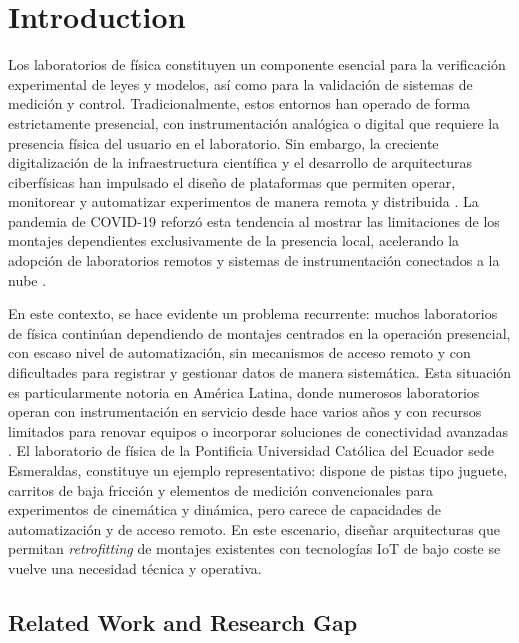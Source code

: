 \documentclass[journal,article,submit,pdftex]{Definitions/mdpi}
\begin{document}

\section{Introduction}

Los laboratorios de f\'isica constituyen un componente esencial para la verificaci\'on experimental de leyes y modelos, as\'i como para la validaci\'on de sistemas de medici\'on y control. Tradicionalmente, estos entornos han operado de forma estrictamente presencial, con instrumentaci\'on anal\'ogica o digital que requiere la presencia f\'isica del usuario en el laboratorio. Sin embargo, la creciente digitalizaci\'on de la infraestructura cient\'ifica y el desarrollo de arquitecturas ciberf\'isicas han impulsado el dise\~no de plataformas que permiten operar, monitorear y automatizar experimentos de manera remota y distribuida \cite{r1}. La pandemia de COVID-19 reforz\'o esta tendencia al mostrar las limitaciones de los montajes dependientes exclusivamente de la presencia local, acelerando la adopci\'on de laboratorios remotos y sistemas de instrumentaci\'on conectados a la nube \cite{r2}.

En este contexto, se hace evidente un problema recurrente: muchos laboratorios de f\'isica contin\'uan dependiendo de montajes centrados en la operaci\'on presencial, con escaso nivel de automatizaci\'on, sin mecanismos de acceso remoto y con dificultades para registrar y gestionar datos de manera sistem\'atica. Esta situaci\'on es particularmente notoria en Am\'erica Latina, donde numerosos laboratorios operan con instrumentaci\'on en servicio desde hace varios a\~nos y con recursos limitados para renovar equipos o incorporar soluciones de conectividad avanzadas \cite{r3,r4}. El laboratorio de f\'isica de la Pontificia Universidad Cat\'olica del Ecuador sede Esmeraldas, constituye un ejemplo representativo: dispone de pistas tipo juguete, carritos de baja fricci\'on y elementos de medici\'on convencionales para experimentos de cinem\'atica y din\'amica, pero carece de capacidades de automatizaci\'on y de acceso remoto. En este escenario, dise\~nar arquitecturas que permitan \textit{retrofitting} de montajes existentes con tecnolog\'ias IoT de bajo coste se vuelve una necesidad t\'ecnica y operativa.

\subsection{Related Work and Research Gap}
\end{document}

